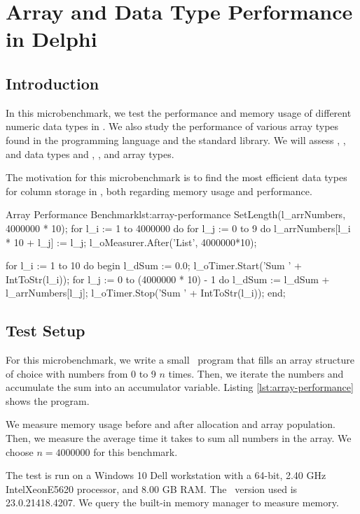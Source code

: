 \chapter{Array and Data Type Performance in Delphi}
\label{app:array-performance}

\section{Introduction}
\label{sec:Introduction}

In this microbenchmark, we test the performance and memory usage of different numeric data types in \delphi. We also study the performance of various array types found in the programming language and the standard library. We will assess , , and  data types and , , and  array types.

The motivation for this microbenchmark is to find the most efficient data types for column storage in \gap, both regarding memory usage and performance.

\begin{delphicode}{Array Performance Benchmark}{lst:array-performance}
  SetLength(l_arrNumbers, 4000000 * 10);
  for l_i := 1 to 4000000 do
    for l_j := 0 to 9 do
      l_arrNumbers[l_i * 10 + l_j] := l_j;
  l_oMeasurer.After('List', 4000000*10);

  for l_i := 1 to 10 do
  begin
    l_dSum := 0.0;
    l_oTimer.Start('Sum ' + IntToStr(l_i));
    for l_j := 0 to (4000000 * 10) - 1 do
      l_dSum := l_dSum + l_arrNumbers[l_j];
    l_oTimer.Stop('Sum ' + IntToStr(l_i));
  end;
\end{delphicode}

\section{Test Setup}
\label{sec:Test Setup}

For this microbenchmark, we write a small \delphi~program that fills an array structure of choice with numbers from 0 to 9 $n$ times. Then, we iterate the numbers and accumulate the sum into an accumulator variable. Listing \ref{lst:array-performance} shows the program.

We measure memory usage before and after allocation and array population. Then, we measure the average time it takes to sum all numbers in the array. We choose $n = 4000000$ for this benchmark.

The test is run on a Windows 10 Dell workstation with a 64-bit, 2.40 GHz Intel\textregistered Xeon\textregistered E5620 processor, and 8.00 GB RAM. The \delphi~version used is 23.0.21418.4207. We query the built-in  memory manager to measure memory.

